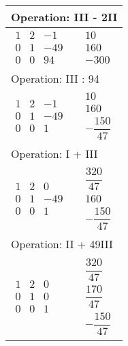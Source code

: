 \begin{longtable}{p{4cm}|p{3cm}}
    \multicolumn{2}{p{\dimexpr4cm+3cm+2\tabcolsep\relax}}{Operation: III - 2II} \\\hline\pagebreak[0]

    $\displaystyle\begin{matrix}
      1 & 2 & -1 \\ 0 & 1 & -49 \\ 0 & 0 & 94
    \end{matrix}$&
    $\displaystyle\begin{matrix}
      10 \\ 160 \\ -300
    \end{matrix}$\\\hline

    \multicolumn{2}{p{\dimexpr4cm+3cm+2\tabcolsep\relax}}{Operation: III : 94} \\\hline\pagebreak[0]

    $\displaystyle\begin{matrix}
      1 & 2 & -1 \\ 0 & 1 & -49 \\ 0 & 0 & 1
    \end{matrix}$&
    $\displaystyle\begin{matrix}
      10 \\ 160 \\ -\dfrac{150}{47}
    \end{matrix}$\\\hline

    \multicolumn{2}{p{\dimexpr4cm+3cm+2\tabcolsep\relax}}{Operation: I + III} \\\hline\pagebreak[0]

    $\displaystyle\begin{matrix}
      1 & 2 & 0 \\ 0 & 1 & -49 \\ 0 & 0 & 1
    \end{matrix}$&
    $\displaystyle\begin{matrix}
      \dfrac{320}{47} \\ 160 \\ -\dfrac{150}{47}
    \end{matrix}$\\\hline

    \multicolumn{2}{p{\dimexpr4cm+3cm+2\tabcolsep\relax}}{Operation: II + 49III} \\\hline\pagebreak[0]

    $\displaystyle\begin{matrix}
      1 & 2 & 0 \\ 0 & 1 & 0 \\ 0 & 0 & 1
    \end{matrix}$&
    $\displaystyle\begin{matrix}
      \dfrac{320}{47} \\ \dfrac{170}{47} \\ -\dfrac{150}{47}
    \end{matrix}$\\\hline


\end{longtable}
